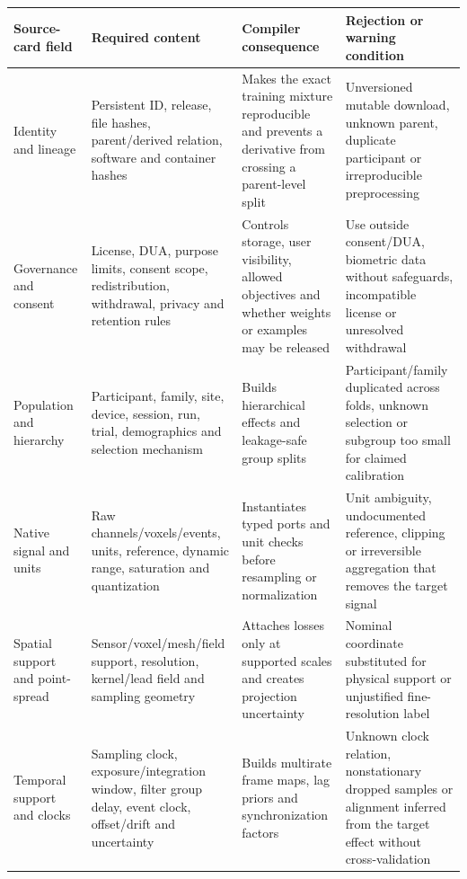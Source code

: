 \begin{table}[!h]
\centering
\footnotesize
\setlength{\tabcolsep}{4pt}
\renewcommand{\arraystretch}{1.10}
\begin{tabularx}{\textwidth}{@{}p{}p{}p{}X@{}}
\toprule
\textbf{Source-card field} & \textbf{Required content} &
\textbf{Compiler consequence} & \textbf{Rejection or warning condition}\\
\midrule
Identity and lineage &
Persistent ID, release, file hashes, parent/derived relation, software and
container hashes &
Makes the exact training mixture reproducible and prevents a derivative from
crossing a parent-level split &
Unversioned mutable download, unknown parent, duplicate participant or
irreproducible preprocessing\\

Governance and consent &
License, DUA, purpose limits, consent scope, redistribution, withdrawal,
privacy and retention rules &
Controls storage, user visibility, allowed objectives and whether weights or
examples may be released &
Use outside consent/DUA, biometric data without safeguards, incompatible
license or unresolved withdrawal\\

Population and hierarchy &
Participant, family, site, device, session, run, trial, demographics and
selection mechanism &
Builds hierarchical effects and leakage-safe group splits &
Participant/family duplicated across folds, unknown selection or subgroup
too small for claimed calibration\\

Native signal and units &
Raw channels/voxels/events, units, reference, dynamic range, saturation and
quantization &
Instantiates typed ports and unit checks before resampling or normalization &
Unit ambiguity, undocumented reference, clipping or irreversible aggregation
that removes the target signal\\

Spatial support and point-spread &
Sensor/voxel/mesh/field support, resolution, kernel/lead field and sampling
geometry &
Attaches losses only at supported scales and creates projection uncertainty &
Nominal coordinate substituted for physical support or unjustified
fine-resolution label\\

Temporal support and clocks &
Sampling clock, exposure/integration window, filter group delay, event clock,
offset/drift and uncertainty &
Builds multirate frame maps, lag priors and synchronization factors &
Unknown clock relation, nonstationary dropped samples or alignment inferred
from the target effect without cross-validation\\


\end{tabularx}
\end{table}
